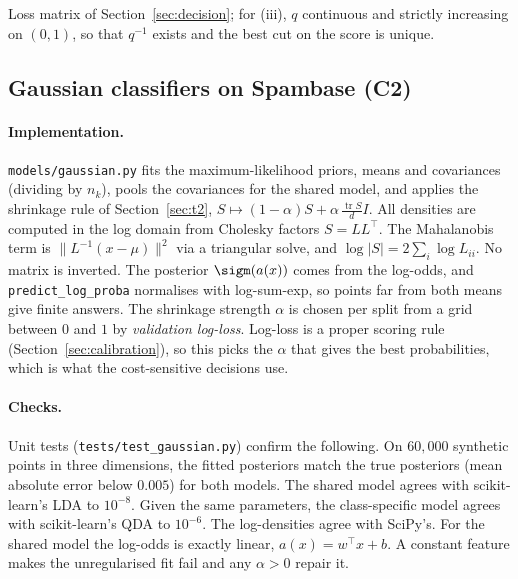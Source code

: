 \begin{assumptions}
Loss matrix of Section~\ref{sec:decision}; for (iii), $q$ continuous and strictly increasing on $(0,1)$,
so that $q^{-1}$ exists and the best cut on the score is unique.
\end{assumptions}

\subsection{Gaussian classifiers on Spambase (C2)}
\label{sec:c2}

\paragraph{Implementation.}
\texttt{models/gaussian.py} fits the maximum-likelihood priors, means and covariances (dividing by
$n_k$), pools the covariances for the shared model, and applies the shrinkage rule of
Section~\ref{sec:t2}, $S\mapsto(1-\alpha)S+\alpha\,\tfrac{\operatorname{tr}S}{d}I$. All
densities are computed in the log domain from Cholesky factors $S=LL^\top$. The Mahalanobis term is
$\lVert L^{-1}(x-\mu)\rVert^2$ via a triangular solve, and $\log|S|=2\sum_i\log L_{ii}$. No matrix is
inverted. The posterior $\sigm(a(x))$ comes from the log-odds, and \texttt{predict\_log\_proba}
normalises with log-sum-exp, so points far from both means give finite answers. The shrinkage
strength $\alpha$ is chosen per split from a grid between $0$ and $1$ by \emph{validation log-loss}.
Log-loss is a proper scoring rule (Section~\ref{sec:calibration}), so this picks the $\alpha$ that gives
the best probabilities, which is what the cost-sensitive decisions use.

\paragraph{Checks.}
Unit tests (\texttt{tests/test\_gaussian.py}) confirm the following. On $60{,}000$ synthetic points in
three dimensions, the fitted posteriors match the true posteriors (mean absolute error below
$0.005$) for both models. The shared model agrees with scikit-learn's LDA to $10^{-8}$. Given the
same parameters, the class-specific model agrees with scikit-learn's QDA to $10^{-6}$. The log-densities
agree with SciPy's. For the shared model the log-odds is exactly linear, $a(x)=w^\top x+b$. A constant
feature makes the unregularised fit fail and any $\alpha>0$ repair it.

